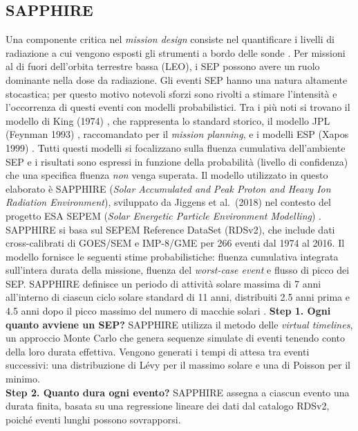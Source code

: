 \documentclass[12pt]{report}
\begin{document}
\subsection{SAPPHIRE}
\enlargethispage{1.25\baselineskip}
Una componente critica nel \textit{mission design} consiste nel quantificare i livelli di radiazione a cui vengono esposti gli strumenti a bordo delle sonde \cite{daly1996space}. Per missioni al di fuori dell'orbita terrestre bassa (LEO), i SEP possono avere un ruolo dominante nella dose da radiazione. Gli eventi SEP hanno una natura altamente stocastica; per questo motivo notevoli sforzi sono rivolti a stimare l'intensità e l'occorrenza di questi eventi con modelli probabilistici. Tra i più noti si trovano il modello di King (1974) \cite{King1974}, che rappresenta lo standard storico, il modello JPL (Feynman 1993) \cite{JPLFeynmann}, raccomandato per il \textit{mission planning}, e i modelli ESP (Xapos 1999) \cite{ESPXapos}. Tutti questi modelli si focalizzano sulla fluenza cumulativa dell'ambiente SEP e i risultati sono espressi in funzione della probabilità (livello di confidenza) che una specifica fluenza \textit{non} venga superata. Il modello utilizzato in questo elaborato è SAPPHIRE (\textit{Solar Accumulated and Peak Proton and Heavy Ion Radiation Environment}), sviluppato da Jiggens et al.\ (2018) \cite{SAPPHIRE_paperJIggens} nel contesto del progetto ESA SEPEM (\textit{Solar Energetic Particle Environment Modelling}) \cite{SEPEM}. SAPPHIRE si basa sul SEPEM Reference DataSet (RDSv2), che include dati cross-calibrati \cite{Rodriguez2017} di GOES/SEM e IMP-8/GME per 266 eventi dal 1974 al 2016. Il modello fornisce le seguenti stime probabilistiche: fluenza cumulativa integrata sull'intera durata della missione, fluenza del \textit{worst-case event} e flusso di picco dei SEP. SAPPHIRE definisce un periodo di attività solare massima di 7 anni all'interno di ciascun ciclo solare standard di 11 anni, distribuiti 2.5 anni prima e 4.5 anni dopo il picco massimo del numero di macchie solari \cite{Feynman1990}.
\clearpage
\noindent \textbf{Step 1. Ogni quanto avviene un SEP?} SAPPHIRE utilizza il metodo delle \textit{virtual timelines}, un approccio Monte Carlo che genera sequenze simulate di eventi tenendo conto della loro durata effettiva. Vengono generati i tempi di attesa tra eventi successivi: una distribuzione di Lévy per il massimo solare e una di Poisson per il minimo.\\
\textbf{Step 2. Quanto dura ogni evento?} SAPPHIRE assegna a ciascun evento una durata finita, basata su una regressione lineare dei dati dal catalogo RDSv2, poiché eventi lunghi possono sovrapporsi.\\
\end{document}
